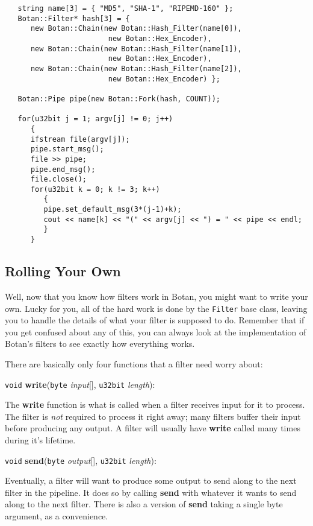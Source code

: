 \documentclass{article}
\newcommand{\function}[1]{\textbf{#1}}
\newcommand{\type}[1]{\texttt{#1}}
\renewcommand{\arg}[1]{\textsl{#1}}
\begin{document}
\begin{verbatim}
   string name[3] = { "MD5", "SHA-1", "RIPEMD-160" };
   Botan::Filter* hash[3] = {
      new Botan::Chain(new Botan::Hash_Filter(name[0]),
                        new Botan::Hex_Encoder),
      new Botan::Chain(new Botan::Hash_Filter(name[1]),
                        new Botan::Hex_Encoder),
      new Botan::Chain(new Botan::Hash_Filter(name[2]),
                        new Botan::Hex_Encoder) };

   Botan::Pipe pipe(new Botan::Fork(hash, COUNT));

   for(u32bit j = 1; argv[j] != 0; j++)
      {
      ifstream file(argv[j]);
      pipe.start_msg();
      file >> pipe;
      pipe.end_msg();
      file.close();
      for(u32bit k = 0; k != 3; k++)
         {
         pipe.set_default_msg(3*(j-1)+k);
         cout << name[k] << "(" << argv[j] << ") = " << pipe << endl;
         }
      }
\end{verbatim}

\pagebreak

\subsection{Rolling Your Own}

Well, now that you know how filters work in Botan, you might want to write
your own. Lucky for you, all of the hard work is done by the \type{Filter} base
class, leaving you to handle the details of what your filter is supposed to
do. Remember that if you get confused about any of this, you can always look at
the implementation of Botan's filters to see exactly how everything works.

There are basically only four functions that a filter need worry about:

\noindent
\type{void} \function{write}(\type{byte} \arg{input}[], \type{u32bit}
\arg{length}):

The \function{write} function is what is called when a filter receives input
for it to process. The filter is \emph{not} required to process it right away;
many filters buffer their input before producing any output. A filter will
usually have \function{write} called many times during it's lifetime.

\noindent
\type{void} \function{send}(\type{byte} \arg{output}[], \type{u32bit}
\arg{length}):

Eventually, a filter will want to produce some output to send along to the next
filter in the pipeline. It does so by calling \function{send} with whatever it
wants to send along to the next filter. There is also a version of
\function{send} taking a single byte argument, as a convenience.
\end{document}

